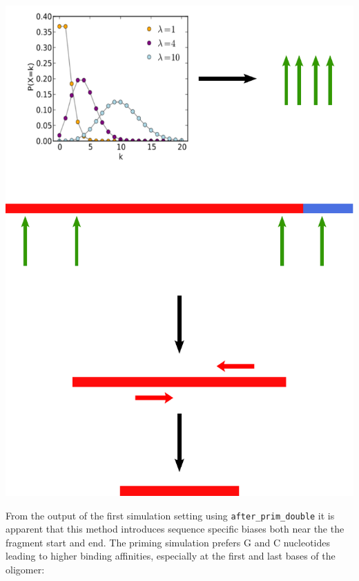 \begin{center}
\includegraphics[scale=0.6]{pix/after_prim_double.pdf}
\end{center}

From the output of the first simulation setting using \texttt{after\_prim\_double} it is apparent that this method introduces
sequence specific biases both near the the fragment start and end. The priming simulation prefers G and C nucleotides leading to higher
binding affinities, especially at the first and last bases of the oligomer: 

